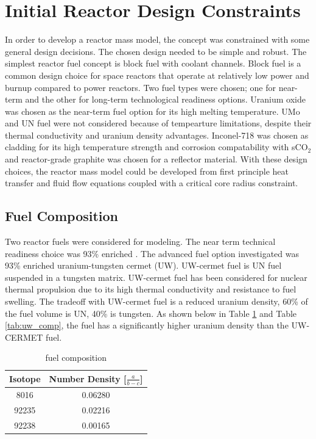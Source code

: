 \section{Initial Reactor Design Constraints}
    In order to develop a reactor mass model, the concept was constrained with
some general design decisions. The chosen design needed to be simple and robust. 
The simplest reactor fuel concept is block fuel with coolant channels. 
Block fuel is a common design choice for space reactors that operate at relatively 
low power and burnup compared to power reactors. Two fuel types were chosen; one for
near-term and the other for long-term technological readiness options. Uranium
oxide was chosen as the near-term fuel option for its high melting temperature.
UMo and UN fuel were not considered because of tempearture limitations, despite
their thermal conductivity and uranium density advantages. Inconel-718 was
chosen as cladding for its high temperature strength and corrosion
compatability with sCO$_2$ and reactor-grade graphite was chosen for a
reflector material. With these design choices, the reactor mass model
could be developed from first principle heat transfer and fluid flow equations
coupled with a critical core radius constraint.

\subsection{Fuel Composition}
Two reactor fuels were considered for modeling. The near term technical
readiness choice was 93\% enriched \uox. The advanced fuel option investigated
was 93\% enriched uranium-tungsten cermet (UW). UW-cermet fuel is UN fuel suspended in a
tungsten matrix. UW-cermet fuel has been considered for nuclear thermal
propulsion due to its high thermal conductivity and resistance to fuel swelling.
The tradeoff with UW-cermet fuel is a reduced uranium density, 60\% of the fuel
volume is UN, 40\% is tungsten. As shown below in Table \ref{tab:uox_comp} and
Table \ref{tab:uw_comp}, the \uox fuel has a significantly higher uranium
density than the UW-CERMET fuel.

\begin{table}[h]
  \centering
  \caption{\uox fuel composition}
  \begin{tabular}{cc}
    \toprule
    Isotope   & Number Density [$\frac{a}{b-c}$] \\
    \midrule
    8016	&	0.06280	\\
    92235	&	0.02216	\\
    92238	&	0.00165	\\
  \end{tabular}
  \label{tab:uox_comp}
\end{table}
    
